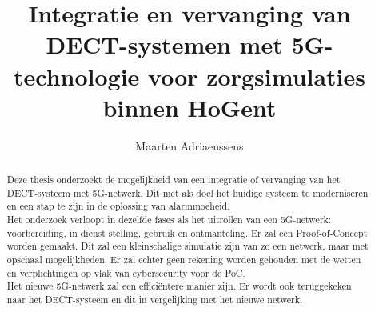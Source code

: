 \documentclass{hogent-article}
\title{Integratie en vervanging van DECT-systemen met 5G-technologie voor zorgsimulaties binnen HoGent}
\author{Maarten Adriaenssens}
\begin{document}
\begin{abstract}
  Deze thesis onderzoekt de mogelijkheid van een integratie of vervanging van het DECT-systeem met 5G-netwerk. Dit met als doel het huidige systeem te moderniseren en een stap te zijn in de oplossing van alarmmoeheid. \\Het onderzoek verloopt in dezelfde fases als het uitrollen van een 5G-netwerk: voorbereiding, in dienst stelling, gebruik en ontmanteling. Er zal een Proof-of-Concept worden gemaakt. Dit zal een kleinschalige simulatie zijn van zo een netwerk, maar met opschaal mogelijkheden. Er zal echter geen rekening worden gehouden met de wetten en verplichtingen op vlak van cybersecurity voor de PoC.\\ Het nieuwe 5G-netwerk zal een efficiëntere manier zijn. Er wordt ook teruggekeken naar het DECT-systeem en dit in vergelijking met het nieuwe netwerk.
\end{abstract}

\tableofcontents



\printbibliography[heading=bibintoc]
\end{document}
